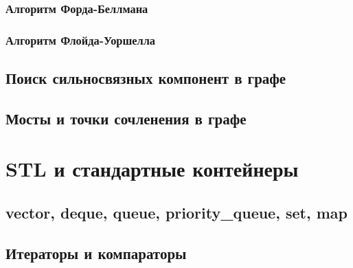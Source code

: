 \documentclass[a4paper]{article}
\begin{document}
\subsubsection{Алгоритм Форда-Беллмана}
\subsubsection{Алгоритм Флойда-Уоршелла}

\subsection{Поиск сильносвязных компонент в графе}
\subsection{Мосты и точки сочленения в графе}

\section{STL и стандартные контейнеры}
\subsection{vector, deque, queue, priority\_queue, set, map}
\subsection{Итераторы и компараторы}
\end{document}
